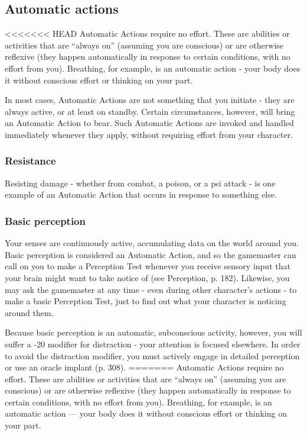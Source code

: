 \subsection{Automatic actions}
\label{sec:combat-automatic-actions}

<<<<<<< HEAD
Automatic Actions require no effort. These are abilities or activities that are ``always on'' (assuming you are conscious) or are otherwise reflexive (they happen automatically in response to certain conditions, with no effort from you). Breathing, for example, is an automatic action - your body does it without conscious effort or thinking on your part.

In most cases, Automatic Actions are not something that you initiate - they are always active, or at least on standby. Certain circumstances, however, will bring an Automatic Action to bear. Such Automatic Actions are invoked and handled immediately whenever they apply, without requiring effort from your character.

\subsubsection{Resistance}

Resisting damage - whether from combat, a poison, or a psi attack - is one example of an Automatic Action that occurs in response to something else.

\subsubsection{Basic perception}

Your senses are continuously active, accumulating data on the world around you. Basic perception is considered an Automatic Action, and so the gamemaster can call on you to make a Perception Test whenever you receive sensory input that your brain might want to take notice of (see Perception, p. 182). Likewise, you may ask the gamemaster at any time - even during other character’s actions - to make a basic Perception Test, just to find out what your character is noticing around them.

Because basic perception is an automatic, subconscious activity, however, you will suffer a -20 modifier for distraction - your attention is focused elsewhere. In order to avoid the distraction modifier, you must actively engage in detailed perception or use an oracle implant (p. 308).
=======
Automatic Actions require no effort. These are abilities or activities that are ``always on'' (assuming you are conscious) or are otherwise reflexive (they happen automatically in response to certain conditions, with no effort from you). Breathing, for example, is an automatic action --- your body does it without conscious effort or thinking on your part.

